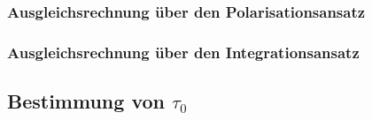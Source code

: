 \subsubsection{Ausgleichsrechnung über den Polarisationsansatz}


\subsubsection{Ausgleichsrechnung über den Integrationsansatz}


\subsection{Bestimmung von \texorpdfstring{$\tau_0$}{tau_0}}
